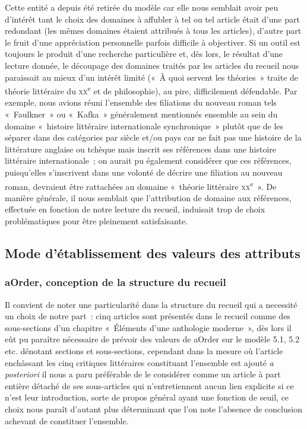     Cette entité a depuis été retirée du modèle car elle nous semblait avoir peu d'intérêt tant le choix des domaines à affubler à tel ou tel article était d'une part redondant (les mêmes domaines étaient attribués à tous les articles), d'autre part le fruit d'une appréciation personnelle parfois difficile à objectiver. Si un outil est toujours le produit d'une recherche particulière et, dès lors, le résultat d'une lecture donnée, le découpage des domaines traités par les articles du recueil nous paraissait au mieux d'un intérêt limité («~À quoi servent les théories~» traite de théorie littéraire du \textsc{xx}\textsuperscript{e} et de philosophie), au pire, difficilement défendable. Par exemple, nous avions réuni l'ensemble des filiations du nouveau roman tels «~Faulkner~» ou «~Kafka~» généralement mentionnés ensemble au sein du domaine «~histoire littéraire internationale synchronique~» plutôt que de les séparer dans des catégories par siècle et/ou pays car \robbe{} ne fait pas une histoire de la littérature anglaise ou tchèque mais inscrit ses références dans une histoire littéraire internationale~; on aurait pu également considérer que ces références, puisqu'elles s'inscrivent dans une volonté de décrire une filiation au nouveau roman, devraient être rattachées au domaine «~théorie littéraire \textsc{xx}\textsuperscript{e}~». De manière générale, il nous semblait que l'attribution de domaine aux références, effectuée en fonction de notre lecture du recueil, induisait trop de choix problématiques pour être pleinement satisfaisante.


\subsection{Mode d'établissement des valeurs des attributs} 
\label{ref:dbEtabValeurs}
\subsubsection{aOrder, conception de la structure du recueil}
Il convient de noter une particularité dans la structure du recueil qui a necessité un choix de notre part~: cinq articles sont présentés dans le recueil comme des sous-sections d'un chapitre «~Éléments d'une anthologie moderne~», dès lors il eût pu paraître nécessaire de prévoir des valeurs de aOrder sur le modèle 5.1, 5.2 etc. dénotant sections et sous-sections, cependant dans la mesure où l'article enchâssant les cinq critiques littéraires constituant l'ensemble est ajouté \textit{a posteriori} il nous a paru préférable de le considérer comme un article à part entière détaché de ses sous-articles qui n'entretiennent aucun lien explicite si ce n'est leur introduction, sorte de propos général ayant une fonction de seuil, ce choix nous paraît d'autant plus déterminant que l'on note l'absence de conclusion achevant de constituer l'ensemble.

